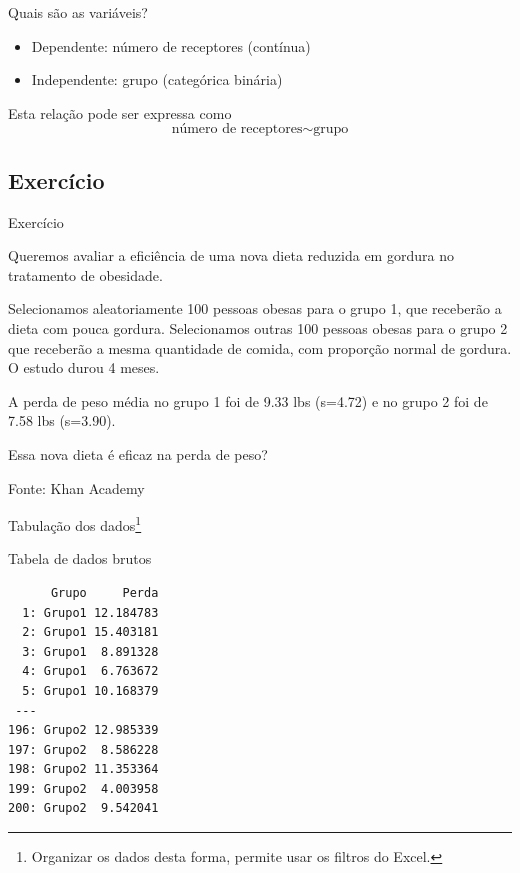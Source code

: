 \documentclass{beamer}
\begin{document}
\begin{frame}{Quais são as variáveis?}
  \begin{itemize}
  \item Dependente: número de receptores (contínua)
  \item Independente: grupo (categórica binária)
  \end{itemize}
  \vfill
  \begin{block}{Esta relação pode ser expressa como}
    \begin{displaymath}
      \text{número de receptores} \sim \text{grupo}
    \end{displaymath}
  \end{block}
\end{frame}

\subsection{Exercício}

\begin{frame}{Exercício}
  \begin{exampleblock}{}
    \small
    Queremos avaliar a eficiência de uma nova dieta reduzida em
    gordura no tratamento de obesidade.

    \bigskip
    {\footnotesize
      Selecionamos aleatoriamente 100 pessoas obesas para o grupo 1, que receberão a dieta com pouca gordura.
      Selecionamos outras 100 pessoas obesas para o grupo 2 que receberão a mesma quantidade de comida, com proporção normal de gordura.
      O estudo durou 4 meses.
    }

    \bigskip
    \begin{exampleblock}{}
      \footnotesize
      A perda de peso média no grupo 1 foi de 9.33 lbs
      (s=4.72) e no grupo 2 foi de 7.58 lbs (s=3.90).
    \end{exampleblock}
  \end{exampleblock}
  \begin{block}{}
    Essa nova dieta é eficaz na perda de peso?
  \end{block}
  \hfill {\footnotesize Fonte: Khan Academy}
\end{frame}

\begin{frame}[fragile]{Tabulação dos dados\footnote{Organizar os dados desta forma, permite usar os filtros do Excel.}}
  \begin{block}{Tabela de dados brutos}
\begin{verbatim}
      Grupo     Perda
  1: Grupo1 12.184783
  2: Grupo1 15.403181
  3: Grupo1  8.891328
  4: Grupo1  6.763672
  5: Grupo1 10.168379
 ---                 
196: Grupo2 12.985339
197: Grupo2  8.586228
198: Grupo2 11.353364
199: Grupo2  4.003958
200: Grupo2  9.542041
\end{verbatim}
  \end{block}
\end{frame}
\end{document}
